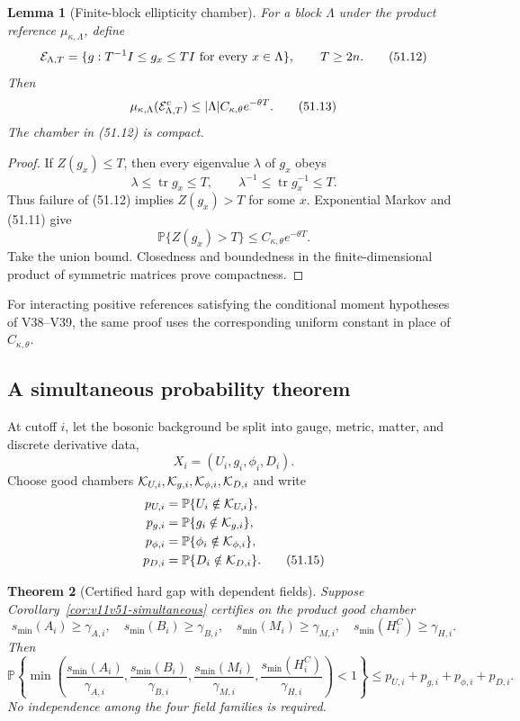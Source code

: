 \documentclass[11pt]{article}
\newtheorem{theorem}{Theorem}[section]
\newtheorem{lemma}[theorem]{Lemma}
\begin{document}
\begin{lemma}[Finite-block ellipticity chamber]
\label{lem:v11v51-metric-chamber}
For a block \(\Lambda\) under the product reference
\(\mu_{\kappa,\Lambda}\), define
\[
 {\cal E}_{\Lambda,T}
     =\{g:T^{-1}I\le g_x\le TI\text{ for every }x\in\Lambda\},
 \qquad T\ge2n.                                               \tag{51.12}
\]
Then
\[
 \mu_{\kappa,\Lambda}({\cal E}_{\Lambda,T}^c)
 \le|\Lambda|C_{\kappa,\theta}e^{-\theta T}.                 \tag{51.13}
\]
The chamber in (51.12) is compact.
\end{lemma}

\begin{proof}
If \(Z(g_x)\le T\), then every eigenvalue \(\lambda\) of \(g_x\)
obeys
\[
              \lambda\le\operatorname{tr}g_x\le T,\qquad
              \lambda^{-1}\le\operatorname{tr}g_x^{-1}\le T.
\]
Thus failure of (51.12) implies \(Z(g_x)>T\) for some \(x\).
Exponential Markov and (51.11) give
\[
 \mathbb P\{Z(g_x)>T\}\le C_{\kappa,\theta}e^{-\theta T}.
\]
Take the union bound.  Closedness and boundedness in the
finite-dimensional product of symmetric matrices prove compactness.
\end{proof}

For interacting positive references satisfying the conditional moment
hypotheses of V38--V39, the same proof uses the corresponding uniform
constant in place of \(C_{\kappa,\theta}\).

\subsection{A simultaneous probability theorem}

At cutoff \(i\), let the bosonic background be split into gauge,
metric, matter, and discrete derivative data,
\[
                           X_i=(U_i,g_i,\phi_i,D_i).            \tag{51.14}
\]
Choose good chambers
\({\cal K}_{U,i},{\cal K}_{g,i},{\cal K}_{\phi,i},{\cal K}_{D,i}\)
and write
\[
\begin{split}
 p_{U,i}&=\mathbb P\{U_i\notin{\cal K}_{U,i}\},\\
 p_{g,i}&=\mathbb P\{g_i\notin{\cal K}_{g,i}\},\\
 p_{\phi,i}&=\mathbb P\{\phi_i\notin{\cal K}_{\phi,i}\},\\
 p_{D,i}&=\mathbb P\{D_i\notin{\cal K}_{D,i}\}.               \tag{51.15}
\end{split}
\]

\begin{theorem}[Certified hard gap with dependent fields]
\label{thm:v11v51-hard-gap}
Suppose Corollary~\ref{cor:v11v51-simultaneous} certifies on the product
good chamber
\[
 s_{\min}(A_i)\ge\gamma_{A,i},\quad
 s_{\min}(B_i)\ge\gamma_{B,i},\quad
 s_{\min}(M_i)\ge\gamma_{M,i},\quad
 s_{\min}(H_i^C)\ge\gamma_{H,i}.                              \tag{51.16}
\]
Then
\[
 \mathbb P\!\left\{
  \min\!\left(
   \frac{s_{\min}(A_i)}{\gamma_{A,i}},
   \frac{s_{\min}(B_i)}{\gamma_{B,i}},
   \frac{s_{\min}(M_i)}{\gamma_{M,i}},
   \frac{s_{\min}(H_i^C)}{\gamma_{H,i}}
       \right)<1\right\}
 \le p_{U,i}+p_{g,i}+p_{\phi,i}+p_{D,i}.                      \tag{51.17}
\]
No independence among the four field families is required.
\end{theorem}
\end{document}
